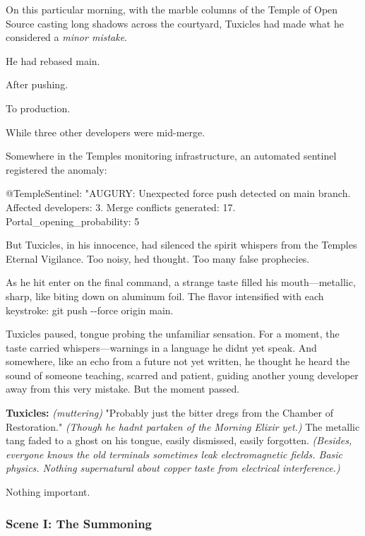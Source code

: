 On this particular morning, with the marble columns of the Temple of Open Source casting long shadows across the courtyard, Tuxicles had made what he considered a \emph{minor mistake}.

He had rebased main.

After pushing.

To production.

While three other developers were mid-merge.

Somewhere in the Temple\textquotesingle s monitoring infrastructure, an automated sentinel registered the anomaly:

\begin{codeblock}
@TempleSentinel: "AUGURY: Unexpected force push detected on main branch. Affected developers: 3. Merge conflicts generated: 17. Portal_opening_probability: 5%
\end{codeblock}

But Tuxicles, in his innocence, had silenced the spirit whispers from the Temple\textquotesingle s Eternal Vigilance. Too noisy, he\textquotesingle d thought. Too many false prophecies.

As he hit enter on the final command, a strange taste filled his mouth---metallic, sharp, like biting down on aluminum foil. The flavor intensified with each keystroke: git push -\/-force origin main.

Tuxicles paused, tongue probing the unfamiliar sensation. For a moment, the taste carried whispers---warnings in a language he didn\textquotesingle t yet speak. And somewhere, like an echo from a future not yet written, he thought he heard the sound of someone teaching, scarred and patient, guiding another young developer away from this very mistake. But the moment passed.

\textbf{Tuxicles:} \emph{(muttering)} "Probably just the bitter dregs from the Chamber of Restoration." \emph{(Though he hadn\textquotesingle t partaken of the Morning Elixir yet.)} The metallic tang faded to a ghost on his tongue, easily dismissed, easily forgotten. \emph{(Besides, everyone knows the old terminals sometimes leak electromagnetic fields. Basic physics. Nothing supernatural about copper taste from electrical interference.)}

Nothing important.

\bookdivider

\subsubsection{Scene I: The Summoning}\label{scene-i-the-summoning}

